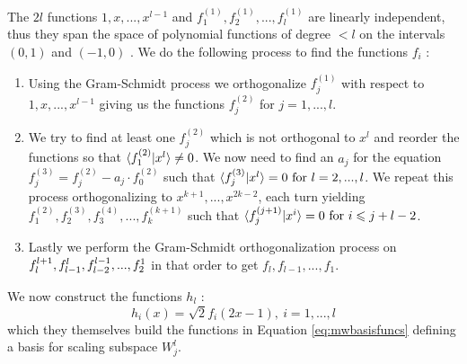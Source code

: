 \documentclass[../master_thesis.tex]{subfiles}
\begin{document}
The $2l$ functions $1, x,..., x^{l-1} $ and $ f^{(1)}_1, f^{(1)}_2, ..., f^{(1)}_l$ are linearly
independent, thus they span the space of polynomial functions of
degree $< l$ on the intervals $(0, 1)$ and $(-1, 0)$ \cite{Alpert1993, Beylkin:MRA}. We do the
following process to find the functions $f_i$ \cite{Alpert1993}:
\begin{enumerate}
  \item Using the Gram-Schmidt process we orthogonalize $f^{(1)}_j$ with respect to $1, x,..., x^{l-1}$
  giving us the functions $f_j^{(2)}$ for $j = 1, ..., l$.
  \item  We try to find at least one $f^{(2)}_j$
  which is not orthogonal to $x^{l}$ and reorder the functions so that $\braket{f_1^{(2)}| x^{l}} \neq 0$.
  We now need to find an $a_j$ for the equation $f_j^{(3)} = f_j^{(2)}-a_j\cdot f_0^{(2)}$ such that
  $\braket{f_j^{(3)}| x^{l}} = 0\  \text{for}\  l = 2, ..., l$. We repeat this process orthogonalizing
  to $x^{k+1}, ..., x^{2k-2}$, each turn yielding $f_1^{(2)}, f_2^{(3)}, f_3^{(4)}, ..., f_k^{(k+1)}$ such that
  $\braket{f_j^{(j+1)}|x^i} = 0 \ \text{for}\  i\leqslant j+l-2$.
  \item  Lastly we perform the Gram-Schmidt orthogonalization process on
  $f_{l}^{l+1}, \\f_{l-1}^{l}, f_{l-2}^{l-1}, ..., f_{2}^{1}$ in that order to get
  $ f_l, f_{l-1}, ..., f_1$.
\end{enumerate}

We now construct the functions $h_l$ \cite{Alpert1993}:
\begin{equation}
  h_i(x)= \sqrt{2}f_i(2x-1), \ i= 1, ..., l
\end{equation}
which they themselves build the functions in Equation \ref{eq:mwbasisfuncs}
defining a basis for scaling subspace $W_j^l$.
\end{document}
